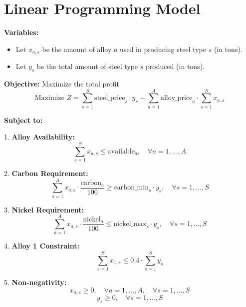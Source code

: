 \documentclass{article}
\begin{document}
\section*{Linear Programming Model}

\textbf{Variables:}
\begin{itemize}
    \item Let \( x_{a,s} \) be the amount of alloy \( a \) used in producing steel type \( s \) (in tons).
    \item Let \( y_s \) be the total amount of steel type \( s \) produced (in tons).
\end{itemize}

\textbf{Objective:} Maximize the total profit
\[
\text{Maximize } Z = \sum_{s=1}^{S} \text{steel\_price}_s \cdot y_s - \sum_{a=1}^{A} \text{alloy\_price}_a \cdot \sum_{s=1}^{S} x_{a,s}
\]

\textbf{Subject to:}

1. \textbf{Alloy Availability:}
\[
\sum_{s=1}^{S} x_{a,s} \leq \text{available}_a, \quad \forall a = 1, \ldots, A
\]

2. \textbf{Carbon Requirement:}
\[
\sum_{a=1}^{A} x_{a,s} \cdot \frac{\text{carbon}_a}{100} \geq \text{carbon\_min}_s \cdot y_s, \quad \forall s = 1, \ldots, S
\]

3. \textbf{Nickel Requirement:}
\[
\sum_{a=1}^{A} x_{a,s} \cdot \frac{\text{nickel}_a}{100} \leq \text{nickel\_max}_s \cdot y_s, \quad \forall s = 1, \ldots, S
\]

4. \textbf{Alloy 1 Constraint:}
\[
\sum_{s=1}^{S} x_{1,s} \leq 0.4 \cdot \sum_{s=1}^{S} y_s
\]

5. \textbf{Non-negativity:}
\[
x_{a,s} \geq 0, \quad \forall a = 1, \ldots, A, \quad \forall s = 1, \ldots, S
\]
\[
y_s \geq 0, \quad \forall s = 1, \ldots, S
\]
\end{document}
